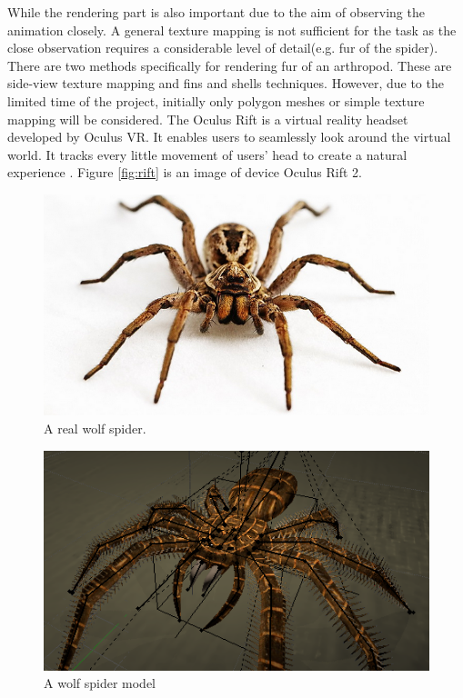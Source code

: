 While the rendering part is also important due to the aim of observing the animation closely. A general texture mapping is not sufficient for the task as the close observation requires a considerable level of detail(e.g. fur of the spider). There are two methods specifically for rendering fur of an arthropod. These are side-view texture mapping and fins and shells techniques\cite{fur}. However, due to the limited time of the project, initially only polygon meshes or simple texture mapping will be considered.
The Oculus Rift is a virtual reality headset developed by Oculus VR. It enables users to seamlessly look around the virtual world. It tracks every little movement of users' head to create a natural experience \cite{rift1}. Figure \ref{fig:rift} is an image of device Oculus Rift 2.



\begin{figure}[htb!]
\centering
\includegraphics[width=14cm]{figures/realSpider.png}
\caption{A real wolf spider. \protect\footnotemark}
\label{fig:realSpider}
\end{figure}


\begin{figure}[htb!]
\centering
\includegraphics[width=13cm]{figures/spiderModel.png}
\caption{A wolf spider model  \protect\footnotemark}
\label{fig:spiderModel}
\end{figure}

